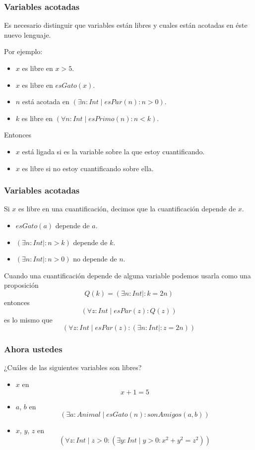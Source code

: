 \documentclass{beamer}
\begin{document}
\begin{frame}[fragile]
    \frametitle{Variables acotadas}
    \pause
    Es necesario distinguir que variables están libres y cuales están acotadas en éste nuevo lenguaje.
    \pause

    Por ejemplo:
    \begin{itemize}
        \pause
        \item $x$ es libre en $x > 5$.
        \pause
        \item $x$ es libre en $esGato(x)$.
        \pause
        \item $n$ está acotada en $(\exists n: Int \mid esPar(n) : n > 0)$.
        \pause
        \item $k$ es libre en $(\forall n: Int \mid esPrimo(n) : n < k)$.
    \end{itemize}

    \pause
    Entonces
    \begin{itemize}
        \pause
        \item $x$ está ligada si es la variable sobre la que estoy cuantificando.
        \pause
        \item $x$ es libre si no estoy cuantificando sobre ella.
    \end{itemize}
\end{frame}

\begin{frame}[fragile]
    \frametitle{Variables acotadas} 
    \pause
    Si $x$ es libre en una cuantificación, decimos que la cuantificación depende de $x$.
    \begin{itemize}
        \pause
        \item $esGato(a)$ depende de $a$.
        \pause
        \item $(\exists n: Int \mid : n > k)$ depende de $k$.
        \pause
        \item $(\exists n: Int \mid : n > 0)$ no depende de $n$.
    \end{itemize}
    \pause
    Cuando una cuantificación depende de alguna variable podemos usarla como una proposición
        \pause
        $$Q(k) = (\exists n: Int \mid : k = 2n)$$
    \pause
    entonces
        \pause
        $$(\forall z: Int \mid esPar(z) : Q(z))$$
    \pause
    es lo mismo que
        \pause
        $$(\forall z: Int \mid esPar(z) : (\exists n: Int \mid : z = 2n))$$
\end{frame}

\begin{frame}[fragile]
    \frametitle{Ahora ustedes}
    \pause
    ¿Cuáles de las siguientes variables son libres?
    \begin{itemize}
        \pause
        \item $x$ en
            $$x + 1 = 5$$
        \pause
        \item $a$, $b$ en 
            $$(\exists a: Animal \mid esGato(n) : sonAmigos(a,b))$$
        \pause
        \item $x$, $y$, $z$ en 
            $$(\forall z: Int \mid z > 0 : (\exists y: Int \mid y > 0 : x^2+y^2=z^2))$$
    \end{itemize}
\end{frame}
\end{document}
